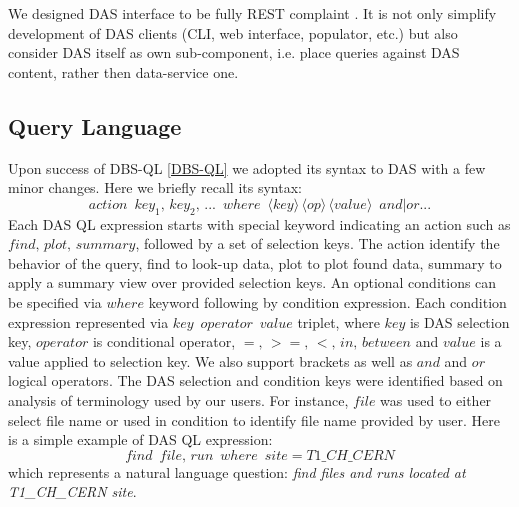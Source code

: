 \documentclass[a4paper]{jpconf}
\begin{document}
We designed DAS interface to be fully REST complaint \cite{REST}. It is not
only simplify development of DAS clients (CLI, web interface, populator, etc.)
but also consider DAS itself as own sub-component, i.e. place queries against
DAS content, rather then data-service one.

\subsection{Query Language\label{DAS-QL}}
Upon success of DBS-QL \ref{DBS-QL} we adopted its syntax to DAS with a few minor
changes. Here we briefly recall its syntax:
\begin{equation}
action\,\,\,
key_1,\, key_2,\, ...\,\,\, where\,\,\,
\langle key\rangle\, 
\langle op\rangle\, 
\langle value\rangle \,\,\, and|or ...
\label{QL_syntax}
\end{equation}
Each DAS QL expression starts with special keyword indicating an action such as 
$find,\, plot,\, summary$, followed by a set of selection keys. The action identify
the behavior of the query, find to look-up data, plot to plot found data, summary to
apply a summary view over provided selection keys. An optional conditions can be 
specified via $where$ keyword following by condition expression.
Each condition expression represented via $key\,\,\, operator\,\,\, value$ triplet, where
$key$ is DAS selection key, $operator$ is conditional operator, 
$=,\, >=,\, <,\, in,\, between$ and $value$ is a value applied to selection key.
We also support brackets as well as $and$ and $or$ logical operators.
The DAS selection and condition keys were identified based on analysis 
of terminology used by our users. For instance, $file$ was used to either
select file name or used in condition to identify file name provided by user.
Here is a simple example of DAS QL expression:
$$
find\,\,\, file,\, run\,\,\, where\,\,\, site=T1\_CH\_CERN
$$
which represents a natural language question: 
{\it find files and runs located at T1\_CH\_CERN site}.
\end{document}
